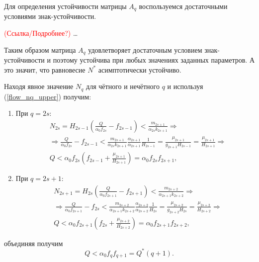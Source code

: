         Для определения устойчивости матрицы \(A_q\) воспользуемся достаточными условиями знак-устойчивости. 
        
        \textcolor{red}{(Ссылка/Подробнее?)} \dots

        Таким образом матрица \(A_q\) удовлетворяет достаточным условием знак-устойчивости и поэтому устойчива при любых значениях заданных параметров. А это значит, что равновесие \(N^*\) асимптотически устойчиво.

        Находя явное значение \(N_q\) для чётного и нечётного \(q\) и используя (\ref{flow_nq_upper}) получим:
        \begin{enumerate}
            \item При \(q = 2s\):
            \begin{equation}
                \begin{split}
                    & N_{2s} = H_{2s-1} \left( \frac{Q}{\alpha_0 f_{2s}} - f_{2s-1} \right) < \frac{m_{2s+1}}{\alpha_{2s} k_{2s+1}} \Rightarrow \\
                    & \Rightarrow \frac{Q}{\alpha_0 f_{2s}} - f_{2s-1} < \frac{m_{2s+1}}{\alpha_{2s} k_{2s+1}} \frac{\alpha_{2s+1}}{\alpha_{2s+1}} \frac{1}{H_{2s-1}} = \frac{\mu_{2s+1}}{g_{2s+1} H_{2s-1}} = \frac{\mu_{2s+1}}{H_{2s+1}} \Rightarrow \\
                    & Q < \alpha_0 f_{2s} \left(  f_{2s-1} + \frac{\mu_{2s+1}}{H_{2s+1}} \right) = \alpha_0 f_{2s} f_{2s+1},        
                \end{split}
            \end{equation}
            
            \item При \(q = 2s+1\):
            \begin{equation}
                \begin{split}
                    & N_{2s+1} = H_{2s} \left( \frac{Q}{\alpha_0 f_{2s+1}} - f_{2s+1} \right) < \frac{m_{2s+2}}{\alpha_{2s+1} k_{2s+2}} \Rightarrow \\
                    & \Rightarrow \frac{Q}{\alpha_0 f_{2s+1}} - f_{2s} < \frac{m_{2s+2}}{\alpha_{2s+1} k_{2s+2}} \frac{\alpha_{2s+2}}{\alpha_{2s+2}} \frac{1}{H_{2s}} = \frac{\mu_{2s+2}}{g_{2s+2} H_{2s}} = \frac{\mu_{2s+2}}{H_{2s+2}} \Rightarrow \\
                    & Q < \alpha_0 f_{2s+1} \left(  f_{2s} + \frac{\mu_{2s+2}}{H_{2s+2}} \right) = \alpha_0 f_{2s+1} f_{2s+2},      
                \end{split}
            \end{equation}
        \end{enumerate}
        объединяя получим
        \begin{equation}
            Q < \alpha_0 f_{q} f_{q+1} = Q^*(q+1).
        \end{equation}

